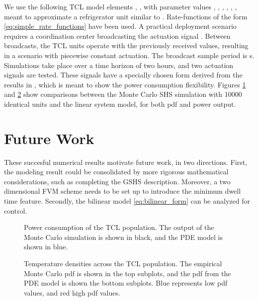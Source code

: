 \documentclass[submission,copyright,creativecommons]{eptcs}
\begin{document}
We use the following TCL model elements ,  ,  with parameter values , , , , , , meant to approximate a refrigerator unit similar to \cite{totu2013control, totu2014demand}. Rate-functions  of the form \eqref{eq:simple_rate_functions} have been used. A practical deployment scenario requires a coordination center broadcasting the actuation signal . Between broadcasts, the TCL units operate with the previously received values, resulting in a scenario with piecewise constant actuation. The broadcast sample period is s. Simulations take place over a time horizon of  two hours, and two actuation signals are tested. These signals have a specially chosen form derived from the results in \cite{totu2014demand}, which is meant to show the power consumption flexibility. Figures \ref{fig:results_1} and \ref{fig:results_2} show comparisons between the Monte Carlo SHS simulation with 10000 identical units and the linear system model, for both pdf and power output. 

\section{Future Work} \label{sec:conclusion}
These succesful numerical results motivate future work, in two directions. First, the modeling result could be consolidated by more rigorous mathematical considerations, such as completing the GSHS description. Moreover, a two dimensional FVM scheme needs to be set up to introduce the minimum dwell time feature. Secondly, the bilinear model \eqref{eq:bilinear_form} can be analyzed for control. 

\begin{figure}[h!] 
\centering
{}  

\caption{Power consumption of the TCL population. The output of the Monte Carlo simulation is shown in black, and the PDE model is shown in blue.}
\label{fig:results_1}
\end{figure}   
\begin{figure}[h!]
\centering
{}  
\caption{Temperature densities across the TCL population. The empirical Monte Carlo pdf is shown in the top subplots, and the pdf from the PDE model is shown the bottom subplots. Blue represents low pdf values, and red high pdf values.}
\label{fig:results_2}
\end{figure} 



                 
\end{document}
